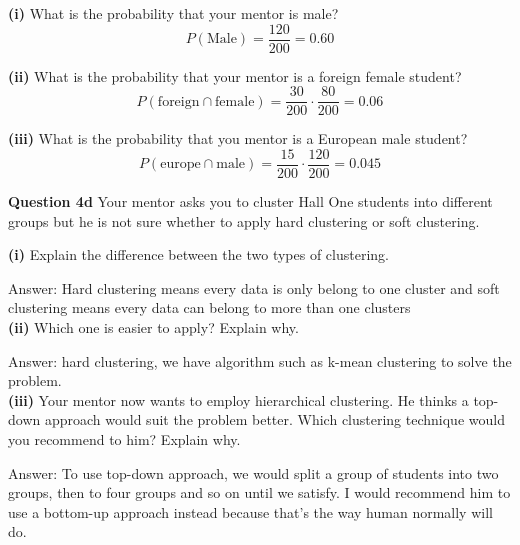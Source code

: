 \documentclass[11pt,a4paper]{report}
\begin{document}
\begin{multicols*}{2}
\noindent \textbf{(i)} What is the probability that your mentor is male?
$$P(\text{Male}) = \frac{120}{200} = 0.60$$

\noindent \textbf{(ii)} What is the probability that your mentor is a foreign female student?
$$P(\text{foreign} \cap \text{female}) = \frac{30}{200}\cdot \frac{80}{200}=0.06$$

\noindent \textbf{(iii)} What is the probability that you mentor is a European male student?
$$P(\text{europe} \cap \text{male}) = \frac{15}{200}\cdot \frac{120}{200}=0.045$$

\noindent \textbf{Question 4d} Your mentor asks you to cluster Hall One students into different groups but he is not sure whether to apply hard clustering or soft clustering.

\noindent \textbf{(i)} Explain the difference between the two types of clustering.

\noindent Answer: Hard clustering means every data is only belong to one cluster and soft clustering means every data can belong to more than one clusters\\

\noindent \textbf{(ii)} Which one is easier to apply? Explain why.

\noindent Answer: hard clustering, we have algorithm such as k-mean clustering to solve the problem.\\

\noindent \textbf{(iii)} Your mentor now wants to employ hierarchical clustering. He thinks a top-down approach would suit the problem better. Which clustering technique would you recommend to him? Explain why. 

\noindent Answer: To use top-down approach, we would split a group of students into two groups, then to four groups and so on until we satisfy. I would recommend him to use a bottom-up approach instead because that's the way human normally will do. 

\end{multicols*}
\end{document}
